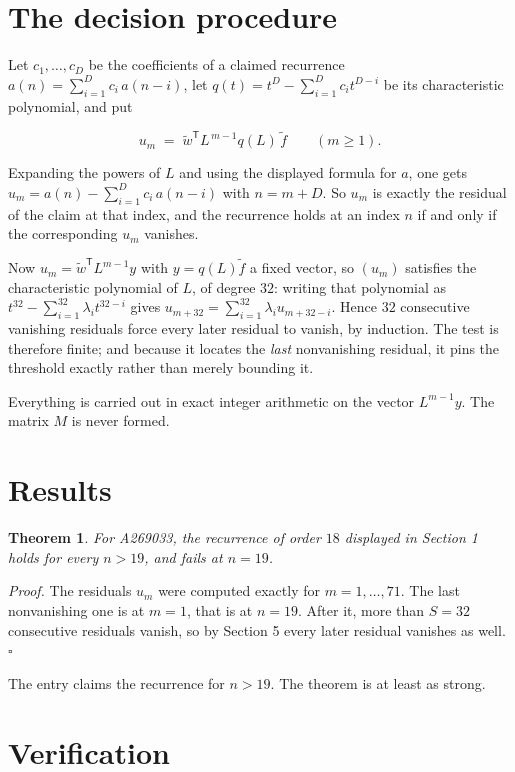 \documentclass[11pt]{article}
\newtheorem{theorem}{Theorem}
\theoremstyle{definition}
\begin{document}
\section{The decision procedure}

Let $c_1,\dots,c_D$ be the coefficients of a claimed recurrence $a(n) = \sum_{i=1}^{D} c_i\,a(n-i)$, let $q(t) = t^{D} - \sum_{i=1}^{D} c_i t^{D-i}$ be its characteristic polynomial, and put

\[u_m \;=\; \tilde w^{\mathsf T} L^{\,m-1} q(L)\,\tilde f \qquad (m \ge 1).\]

Expanding the powers of $L$ and using the displayed formula for $a$, one gets $u_m = a(n) - \sum_{i=1}^{D} c_i\,a(n-i)$ with $n = m + D$. So $u_m$ is exactly the residual of the claim at that index, and the recurrence holds at an index $n$ if and only if the corresponding $u_m$ vanishes.

Now $u_m = \tilde w^{\mathsf T} L^{m-1} y$ with $y = q(L)\tilde f$ a fixed vector, so $(u_m)$ satisfies the characteristic polynomial of $L$, of degree $32$: writing that polynomial as $t^{32} - \sum_{i=1}^{32} \lambda_i t^{32-i}$ gives $u_{m+32} = \sum_{i=1}^{32} \lambda_i u_{m+32-i}$. Hence $32$ consecutive vanishing residuals force every later residual to vanish, by induction. The test is therefore finite; and because it locates the {\itshape last} nonvanishing residual, it pins the threshold exactly rather than merely bounding it.

Everything is carried out in exact integer arithmetic on the vector $L^{m-1}y$. The matrix $M$ is never formed.

\section{Results}

\begin{theorem} For A269033, the recurrence of order $18$ displayed in Section 1 holds for every $n > 19$, and fails at $n = 19$.\end{theorem}

{\itshape Proof.} The residuals $u_m$ were computed exactly for $m = 1,\dots,71$. The last nonvanishing one is at $m = 1$, that is at $n = 19$. After it, more than $S = 32$ consecutive residuals vanish, so by Section 5 every later residual vanishes as well. $\square$

The entry claims the recurrence for $n > 19$. The theorem is at least as strong.

\section{Verification}
\end{document}
